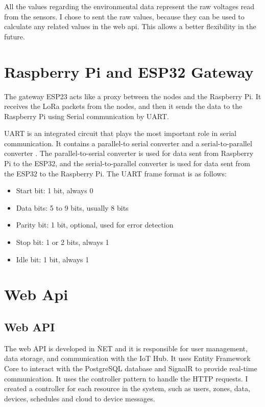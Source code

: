 All the values regarding the environmental data represent the raw
voltages read from the sensors. I chose to sent the raw values, 
because they can be used to calculate any related values in the web api.
This allows a better flexibility in the future.

\section{Raspberry Pi and ESP32 Gateway}
The gateway ESP23 acts like a proxy between the nodes and the Raspberry Pi.
It receives the LoRa packets from the nodes, and then it sends the data to 
the Raspberry Pi using Serial communication by UART.

UART is an integrated circuit that plays the most important role in serial communication.
It contains a parallel-to serial converter and a serial-to-parallel converter\cite{uderstandingUart}
\cite{laddha2013review}. The 
parallel-to-serial converter is used for data sent from Raspberry Pi to the ESP32,
and the serial-to-parallel converter is used for data sent from the ESP32 to the Raspberry Pi.
The UART frame format is as follows:
\begin{itemize}
    \item Start bit: 1 bit, always 0
    \item Data bits: 5 to 9 bits, usually 8 bits
    \item Parity bit: 1 bit, optional, used for error detection
    \item Stop bit: 1 or 2 bits, always 1
    \item Idle bit: 1 bit, always 1
\end{itemize}

\section {Web Api}
\subsection{Web API}
The web API is developed in \.NET and it is responsible
for user management, data storage, and communication with the IoT Hub.
It uses Entity Framework Core to interact with the 
PostgreSQL database and SignalR to provide real-time communication.
It uses the controller pattern to handle the HTTP requests. 
I created a controller for each resource in the system,
such as users, zones, data, devices, schedules and cloud to device messages.

